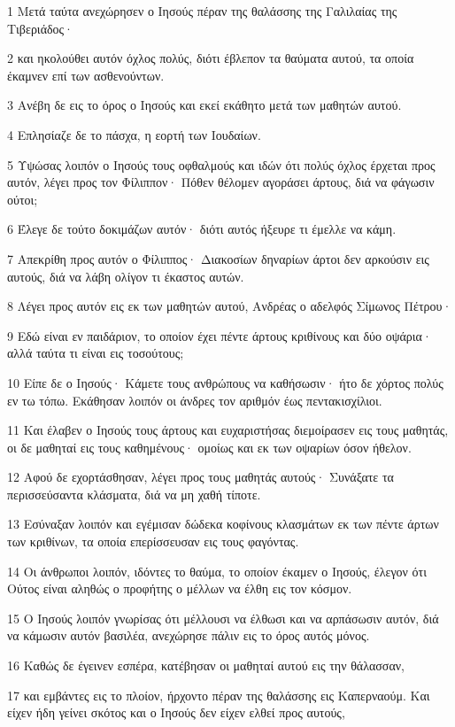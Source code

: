 \par 1 Μετά ταύτα ανεχώρησεν ο Ιησούς πέραν της θαλάσσης της Γαλιλαίας της Τιβεριάδος·
\par 2 και ηκολούθει αυτόν όχλος πολύς, διότι έβλεπον τα θαύματα αυτού, τα οποία έκαμνεν επί των ασθενούντων.
\par 3 Ανέβη δε εις το όρος ο Ιησούς και εκεί εκάθητο μετά των μαθητών αυτού.
\par 4 Επλησίαζε δε το πάσχα, η εορτή των Ιουδαίων.
\par 5 Υψώσας λοιπόν ο Ιησούς τους οφθαλμούς και ιδών ότι πολύς όχλος έρχεται προς αυτόν, λέγει προς τον Φίλιππον· Πόθεν θέλομεν αγοράσει άρτους, διά να φάγωσιν ούτοι;
\par 6 Έλεγε δε τούτο δοκιμάζων αυτόν· διότι αυτός ήξευρε τι έμελλε να κάμη.
\par 7 Απεκρίθη προς αυτόν ο Φίλιππος· Διακοσίων δηναρίων άρτοι δεν αρκούσιν εις αυτούς, διά να λάβη ολίγον τι έκαστος αυτών.
\par 8 Λέγει προς αυτόν εις εκ των μαθητών αυτού, Ανδρέας ο αδελφός Σίμωνος Πέτρου·
\par 9 Εδώ είναι εν παιδάριον, το οποίον έχει πέντε άρτους κριθίνους και δύο οψάρια· αλλά ταύτα τι είναι εις τοσούτους;
\par 10 Είπε δε ο Ιησούς· Κάμετε τους ανθρώπους να καθήσωσιν· ήτο δε χόρτος πολύς εν τω τόπω. Εκάθησαν λοιπόν οι άνδρες τον αριθμόν έως πεντακισχίλιοι.
\par 11 Και έλαβεν ο Ιησούς τους άρτους και ευχαριστήσας διεμοίρασεν εις τους μαθητάς, οι δε μαθηταί εις τους καθημένους· ομοίως και εκ των οψαρίων όσον ήθελον.
\par 12 Αφού δε εχορτάσθησαν, λέγει προς τους μαθητάς αυτούς· Συνάξατε τα περισσεύσαντα κλάσματα, διά να μη χαθή τίποτε.
\par 13 Εσύναξαν λοιπόν και εγέμισαν δώδεκα κοφίνους κλασμάτων εκ των πέντε άρτων των κριθίνων, τα οποία επερίσσευσαν εις τους φαγόντας.
\par 14 Οι άνθρωποι λοιπόν, ιδόντες το θαύμα, το οποίον έκαμεν ο Ιησούς, έλεγον ότι Ούτος είναι αληθώς ο προφήτης ο μέλλων να έλθη εις τον κόσμον.
\par 15 Ο Ιησούς λοιπόν γνωρίσας ότι μέλλουσι να έλθωσι και να αρπάσωσιν αυτόν, διά να κάμωσιν αυτόν βασιλέα, ανεχώρησε πάλιν εις το όρος αυτός μόνος.
\par 16 Καθώς δε έγεινεν εσπέρα, κατέβησαν οι μαθηταί αυτού εις την θάλασσαν,
\par 17 και εμβάντες εις το πλοίον, ήρχοντο πέραν της θαλάσσης εις Καπερναούμ. Και είχεν ήδη γείνει σκότος και ο Ιησούς δεν είχεν ελθεί προς αυτούς,
